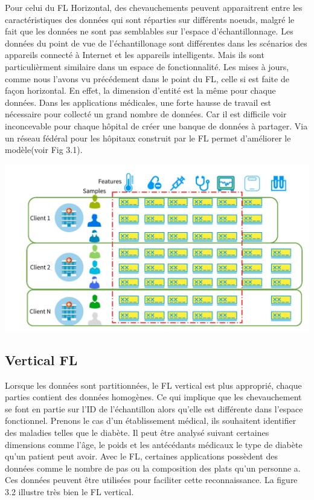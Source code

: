 \documentclass[12pt,a4paper]{report}
\begin{document}
Pour celui du FL Horizontal, des chevauchements peuvent apparaitrent entre les caractéristiques des données qui sont réparties sur différents noeuds, malgré le fait que les données ne sont pas semblables sur l'espace d'échantillonnage. Les données du point de vue de l'échantillonage sont différentes dans les scénarios des appareils connecté à Internet et les appareils intelligents. Mais ils sont particulièrment similaire dans un espace de fonctionnalité. Les mises à jours, comme nous l'avons vu précédement dans le point du FL, celle si est faite de façon horizontal. En effet, la dimension d'entité est la même pour chaque données. Dans les applications médicales, une forte hausse de travail est nécessaire pour collecté un grand nombre de données. Car il est difficile voir inconcevable pour chaque hôpital de créer une banque de données à partager. Via un réseau fédéral pour les hôpitaux construit par le FL permet d'améliorer le modèle(voir Fig 3.1).

\begin{center}
	\includegraphics[scale=0.2]{fl_horizontal}
	\label{fig1}
\end{center}


\subsection{Vertical FL}

Lorsque les données sont partitionnées, le FL vertical est plus approprié, chaque parties contient des données homogènes. Ce qui implique que les chevauchement se font en partie sur l'ID de l'échantillon alors qu'elle est différente dans l'espace fonctionnel. Prenons le cas d'un établissement médical, ils souhaitent identifier des maladies telles que le diabète. Il peut être analysé suivant certaines dimensions comme l'âge, le poids et les antécédants médicaux le type de diabète qu'un patient peut avoir. Avec le FL, certaines applications possèdent des données comme le nombre de pas ou la composition des plats qu'un personne a. Ces données peuvent être utilisées pour faciliter cette reconnaissance. La figure 3.2 illustre très bien le FL vertical.
\end{document}
